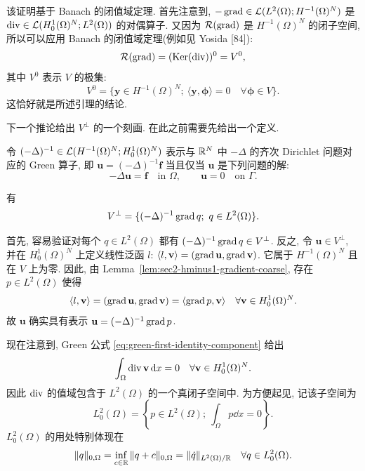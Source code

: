 \begin{Proof}
该证明基于 Banach 的闭值域定理. 首先注意到,
$-\operatorname{grad}\in\mathcal{L}(L^2(\Omega);H^{-1}(\Omega)^N)$ 是
$\operatorname{div}\in\mathcal{L}(H_0^1(\Omega)^N;L^2(\Omega))$ 的对偶算子. 又因为
$\mathcal{R}(\operatorname{grad})$ 是 $H^{-1}(\Omega)^N$ 的闭子空间, 所以可以应用 Banach 的闭值域定理(例如见 Yosida [84]):
\[
  \mathcal{R}(\operatorname{grad})=(\operatorname{Ker}(\operatorname{div}))^0=V^0,
\]
其中 $V^0$ 表示 $V$ 的极集:
\begin{equation}\label{eq:sec2-polar-set}
  V^0=\{\mathbf y\in H^{-1}(\Omega)^N;\ \langle\mathbf y,\boldsymbol\phi\rangle=0
  \quad\forall\boldsymbol\phi\in V\}.
\end{equation}
这恰好就是所述引理的结论.
\end{Proof}

下一个推论给出 $V^\perp$ 的一个刻画. 在此之前需要先给出一个定义.

\setcounter{statement}{0}
\begin{Definition}\label{def:sec2-greens-operator}
令 $(-\Delta)^{-1}\in\mathcal{L}(H^{-1}(\Omega)^N;H_0^1(\Omega)^N)$ 表示与
$\mathbb{R}^N$ 中 $-\Delta$ 的齐次 Dirichlet 问题对应的 Green 算子, 即
$\mathbf u=(-\Delta)^{-1}\mathbf f$ 当且仅当 $\mathbf u$ 是下列问题的解:
\[
  -\Delta\mathbf u=\mathbf f\quad\text{in }\Omega,
  \qquad \mathbf u=0\quad\text{on }\Gamma.
\]
\end{Definition}

\setcounter{statement}{2}
\begin{Corollary}\label{cor:sec2-vperp-green}
有
\[
  V^\perp=\{(-\Delta)^{-1}\operatorname{grad} q;\ q\in L^2(\Omega)\}.
\]
\end{Corollary}
\begin{Proof}
首先, 容易验证对每个 $q\in L^2(\Omega)$ 都有
$(-\Delta)^{-1}\operatorname{grad} q\in V^\perp$. 反之, 令 $\mathbf u\in V^\perp$, 并在
$H_0^1(\Omega)^N$ 上定义线性泛函 $l$:
$\langle l,\mathbf v\rangle=(\operatorname{grad}\mathbf u,\operatorname{grad}\mathbf v)$. 它属于
$H^{-1}(\Omega)^N$ 且在 $V$ 上为零. 因此, 由
Lemma~\ref{lem:sec2-hminus1-gradient-coarse}, 存在
$p\in L^2(\Omega)$ 使得
\[
  \langle l,\mathbf v\rangle=(\operatorname{grad}\mathbf u,\operatorname{grad}\mathbf v)
  =\langle\operatorname{grad} p,\mathbf v\rangle
  \quad\forall\mathbf v\in H_0^1(\Omega)^N.
\]
故 $\mathbf u$ 确实具有表示 $\mathbf u=(-\Delta)^{-1}\operatorname{grad} p$.
\end{Proof}

现在注意到, Green 公式 \eqref{eq:green-first-identity-component} 给出
\[
  \int_\Omega \operatorname{div}\mathbf v\,\mathrm{d} x=0
  \quad\forall\mathbf v\in H_0^1(\Omega)^N.
\]
因此 $\operatorname{div}$ 的值域包含于 $L^2(\Omega)$ 的一个真闭子空间中. 为方便起见, 记该子空间为
\[
  L_0^2(\Omega)=\left\{p\in L^2(\Omega);\ \int_\Omega p\dd x=0\right\}.
\]
$L_0^2(\Omega)$ 的用处特别体现在
\begin{equation}\label{eq:sec2-l20-quotient-norm}
  \|q\|_{0,\Omega}=\inf_{c\in\mathbb{R}}\|q+c\|_{0,\Omega}
  =\|\dot q\|_{L^2(\Omega)/\mathbb{R}}
  \quad\forall q\in L_0^2(\Omega).
\end{equation}

